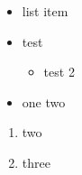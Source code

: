 \documentclass{article}
\begin{document}
\begin{itemize}
\item list item
\item test
\begin{itemize}
\item test 2
\end{itemize}
\item one two
\end{itemize}
\begin{enumerate}
\item two
\item three
\end{enumerate}
\end{document}
